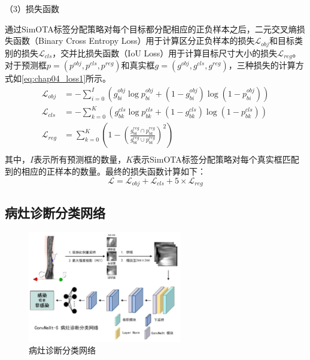 （3）损失函数

通过SimOTA标签分配策略对每个目标都分配相应的正负样本之后，二元交叉熵损失函数（Binary Cross Entropy Loss）用于计算区分正负样本的损失\(\mathcal{L}_{obj}\)和目标类别的损失\(\mathcal{L}_{cls}\)，交并比损失函数（IoU Loss）用于计算目标尺寸大小的损失\(\mathcal{L}_{reg}\)。对于预测框\(p = (p^{obj}, p^{cls}, p^{reg})\)和真实框\(g = (g^{obj}, g^{cls}, g^{reg})\)，三种损失的计算方式如\ref{eq:chap04_loss1}所示。
\begin{equation}
    \begin{aligned}
        \mathcal{L}_{obj} & = -\sum_{i=0}^I( g^{obj}_{bi} \log p^{obj}_{bi} +  (1- g^{obj}_{bi})\log(1-p^{obj}_{bi} ))      \\
        \mathcal{L}_{cls} & = -\sum_{k=0}^K( g^{cls}_{bk} \log p^{cls}_{bk} +  (1- g^{cls}_{bk})\log(1-p^{cls}_{bk} ))      \\
        \mathcal{L}_{reg} & = \sum_{k=0}^K( 1 - (\frac{g^{reg}_{bk} \cap p^{reg}_{bk}}{g^{reg}_{bk} \cup p^{reg}_{bk}})^2 ) \\
    \end{aligned}
    \label{eq:chap04_loss1}
\end{equation}
其中，\(I\)表示所有预测框的数量，\(K\)表示SimOTA标签分配策略对每个真实框匹配到的相应的正样本的数量。最终的损失函数计算如下：
\begin{equation}
    \mathcal{L}  = \mathcal{L}_{obj} + \mathcal{L}_{cls} + 5 \times \mathcal{L}_{reg}
\end{equation}

\subsection{病灶诊断分类网络}

\begin{figure}[b]
    \centering
    \includegraphics[width=0.6\textwidth]{figures/chap04_classifier.jpg}
    \caption{病灶诊断分类网络}
    \label{fig:chap04_classifier}
\end{figure}

